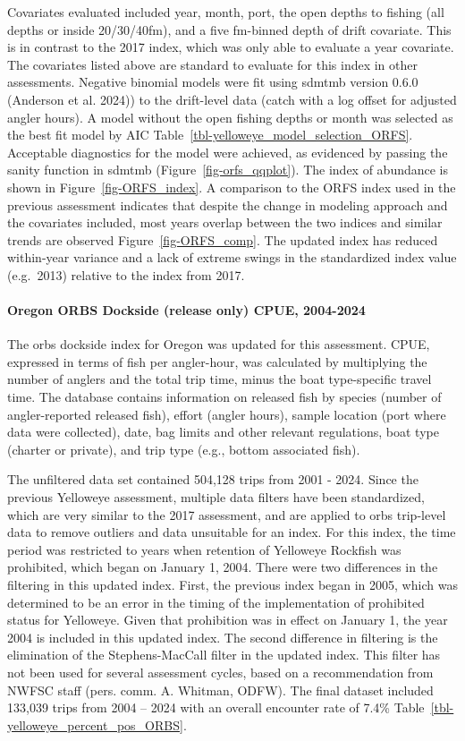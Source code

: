 \documentclass[
]{scrartcl}
\let\oldparagraph\paragraph
\renewcommand{\paragraph}[1]{\oldparagraph{#1}\mbox{}}
\begin{document}
Covariates evaluated included year, month, port, the open depths to
fishing (all depths or inside 20/30/40fm), and a five fm-binned depth of
drift covariate. This is in contrast to the 2017 index, which was only
able to evaluate a year covariate. The covariates listed above are
standard to evaluate for this index in other assessments. Negative
binomial models were fit using \gls{sdmtmb} version 0.6.0 (Anderson et
al. 2024)) to the drift-level data (catch with a log offset for adjusted
angler hours). A model without the open fishing depths or month was
selected as the best fit model by AIC
Table~\ref{tbl-yelloweye_model_selection_ORFS}. Acceptable diagnostics
for the model were achieved, as evidenced by passing the sanity function
in \gls{sdmtmb} (Figure~\ref{fig-orfs_qqplot}). The index of abundance
is shown in Figure~\ref{fig-ORFS_index}. A comparison to the ORFS index
used in the previous assessment indicates that despite the change in
modeling approach and the covariates included, most years overlap
between the two indices and similar trends are observed
Figure~\ref{fig-ORFS_comp}. The updated index has reduced within-year
variance and a lack of extreme swings in the standardized index value
(e.g.~2013) relative to the index from 2017.

\paragraph{Oregon ORBS Dockside (release only) CPUE,
2004-2024}\label{oregon-orbs-dockside-release-only-cpue-2004-2024}

The \gls{orbs} dockside index for Oregon was updated for this
assessment. CPUE, expressed in terms of fish per angler-hour, was
calculated by multiplying the number of anglers and the total trip time,
minus the boat type-specific travel time. The database contains
information on released fish by species (number of angler-reported
released fish), effort (angler hours), sample location (port where data
were collected), date, bag limits and other relevant regulations, boat
type (charter or private), and trip type (e.g., bottom associated fish).

The unfiltered data set contained 504,128 trips from 2001 - 2024. Since
the previous Yelloweye assessment, multiple data filters have been
standardized, which are very similar to the 2017 assessment, and are
applied to \gls{orbs} trip-level data to remove outliers and data
unsuitable for an index. For this index, the time period was restricted
to years when retention of Yelloweye Rockfish was prohibited, which
began on January 1, 2004. There were two differences in the filtering in
this updated index. First, the previous index began in 2005, which was
determined to be an error in the timing of the implementation of
prohibited status for Yelloweye. Given that prohibition was in effect on
January 1, the year 2004 is included in this updated index. The second
difference in filtering is the elimination of the Stephens-MacCall
filter in the updated index. This filter has not been used for several
assessment cycles, based on a recommendation from NWFSC staff (pers.
comm. A. Whitman, ODFW). The final dataset included 133,039 trips from
2004 -- 2024 with an overall encounter rate of 7.4\%
Table~\ref{tbl-yelloweye_percent_pos_ORBS}.
\end{document}
